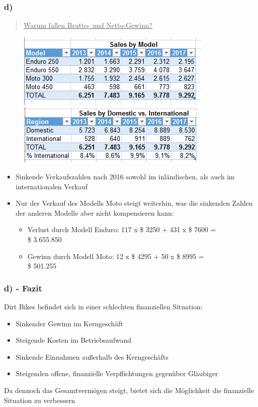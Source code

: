 \documentclass{beamer}
\begin{document}
\begin{frame}
\frametitle{d)}

\begin{quote}
\underline{Warum fallen Brutto- und Netto-Gewinn?}
\end{quote}

\begin{figure}
\includegraphics[scale=0.46]{financials3.PNG}
\includegraphics[scale=0.5]{financials4.PNG}
\end{figure}

\begin{itemize}
\item Sinkende Verkaufszahlen nach 2016 sowohl im inl\"andischen, als auch im internationalen Verkauf
\item Nur der Verkauf des Modells Moto steigt weiterhin, was die sinkenden Zahlen der anderen Modelle aber nicht kompensieren kann:
	\begin{itemize}
		\item Verlust durch Modell Enduro: 117 x \$ 3250 + 431 x \$ 7600 =\\ \$ 3.655.850
		\item Gewinn durch Modell Moto: 12 x \$ 4295 + 50 x \$ 8995 =\\ \$ 501.255
	\end{itemize}
\end{itemize}

\end{frame}

\begin{frame}
\frametitle{d) - Fazit}

Dirt Bikes befindet sich in einer schlechten finanziellen Situation:
\begin{itemize}
\item Sinkender Gewinn im Kerngeschäft
\item Steigende Kosten im Betriebsaufwand
\item Sinkende Einnahmen außerhalb des Kerngesch\"afts
\item Steigenden offene, finanzielle Verpflichtungen gegenüber Gl\"aubiger
\end{itemize}

Da dennoch das Gesamtverm\"ogen steigt, bietet sich die M\"oglichkeit die finanzielle Situation zu verbessern

\end{frame}
\end{document}
